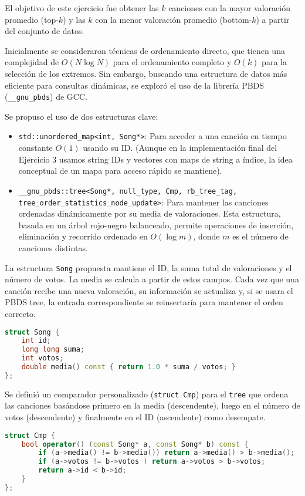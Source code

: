 \documentclass{article}
\begin{document}
El objetivo de este ejercicio fue obtener las \(k\) canciones con la mayor valoración promedio (top-\(k\)) y las \(k\) con la menor valoración promedio (bottom-\(k\)) a partir del conjunto de datos.

Inicialmente se consideraron técnicas de ordenamiento directo, que tienen una complejidad de \(O(N \log N)\) para el ordenamiento completo y \(O(k)\) para la selección de los extremos. Sin embargo, buscando una estructura de datos más eficiente para consultas dinámicas, se exploró el uso de la librería PBDS (\texttt{\_\_gnu\_pbds}) de GCC.

Se propuso el uso de dos estructuras clave:
\begin{itemize}[label=\textbullet]
    \item \texttt{std::unordered\_map<int, Song*>}: Para acceder a una canción en tiempo constante \(O(1)\) usando su ID. (Aunque en la implementación final del Ejercicio 3 usamos string IDs y vectores con maps de string a índice, la idea conceptual de un mapa para acceso rápido se mantiene).
    \item \texttt{\_\_gnu\_pbds::tree<Song*, null\_type, Cmp, rb\_tree\_tag, tree\_order\_statistics\_node\_update>}: Para mantener las canciones ordenadas dinámicamente por su media de valoraciones. Esta estructura, basada en un árbol rojo-negro balanceado, permite operaciones de inserción, eliminación y recorrido ordenado en \(O(\log m)\), donde \(m\) es el número de canciones distintas.
\end{itemize}

La estructura \texttt{Song} propuesta mantiene el ID, la suma total de valoraciones y el número de votos. La media se calcula a partir de estos campos. Cada vez que una canción recibe una nueva valoración, su información se actualiza y, si se usara el PBDS tree, la entrada correspondiente se reinsertaría para mantener el orden correcto.

\begin{lstlisting}[language=C++, caption=Estructura Song propuesta]
struct Song {
    int id;
    long long suma;
    int votos;
    double media() const { return 1.0 * suma / votos; }
};
\end{lstlisting}

Se definió un comparador personalizado (\texttt{struct Cmp}) para el \texttt{tree} que ordena las canciones basándose primero en la media (descendente), luego en el número de votos (descendente) y finalmente en el ID (ascendente) como desempate.

\begin{lstlisting}[language=C++, caption=Comparador Cmp para ordenar Songs]
struct Cmp {
    bool operator() (const Song* a, const Song* b) const {
        if (a->media() != b->media()) return a->media() > b->media();
        if (a->votos != b->votos ) return a->votos > b->votos;
        return a->id < b->id;
    }
};
\end{lstlisting}
\end{document}
